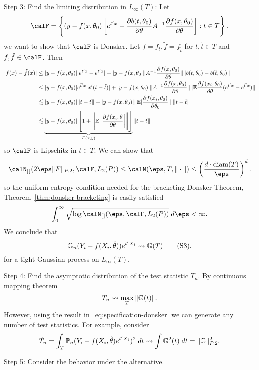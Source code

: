 \begin{example*}
	\underline{Step 3:} Find the limiting distribution in \(L_\infty(T)\): 
	Let 
	\[
		\calF = \left\{(y-f(x,\theta_0)\left[e^{t'x}-\frac{\partial b(t,\theta_0)}{\partial \theta}A^{-1}\frac{\partial f(x,\theta_0)}{\partial \theta}\right]: t\in T\right\}
	.\] 
	we want to show that \(\calF\) is Donsker. Let \(f = f_t, \tilde f = f_{\tilde t}\) for \(t,\tilde t \in T\) and \(f,\tilde f \in\calF\). Then
	\begin{align*}
		|f(x) - \tilde f(x)| 
		&\leq |y-f(x,\theta_0)||e^{t'x}-e^{\tilde t'x}| + |y-f(x,\theta_0|\|A^{-1}\frac{\partial f(x,\theta_0)}{\partial \theta}\|	\|b(t,\theta_0)-b(\tilde t,\theta_0)\| \\
		&\leq |y-f(x,\theta_0)|e^{\bar t' x}|x'(t-\tilde t)| + |y-f(x,\theta_0)| \|A^{-1}\frac{\partial f(x,\theta_0)}{\partial \theta}\|\|\mathbb{E}\frac{\partial f(x_i,\theta_0)}{\partial \theta}(e^{t'x}-e^{\tilde t'x})\|\\
		&\lesssim |y-f(x,\theta_0)|\|t-\tilde t\| + |y-f(x,\theta_0)|\|\mathbb{E}|\frac{\partial f(x_i,\theta_0)}{\partial \theta_0}|\|\|t-\tilde t\| \\
		&\lesssim \underbrace{|y-f(x,\theta_0)|\left[1+ \left\|\mathbb{E}\left|\frac{\partial f(x_i,\theta}{\partial \theta}\right|\right\|\right]}_{F(x,y)}\|t-\tilde t\|
	\end{align*}
	so \(\calF\) is Lipschitz in \(t\in T\). We can show that 
	\[
		\calN_{[\hspace{0.1em}]}(2\eps\|F\|_{P,2},\calF,L_2(P)) \leq \calN(\eps,T,\|\cdot\|) \leq  \left(\frac{d\cdot \text{diam}(T)}{\eps}\right)^d
	.\]
	so the uniform entropy condition needed for the bracketing Donsker Theorem, Theorem~\ref{thm:donsker-bracketing} is easily satisfied 
	\[
		\int_{0}^{\infty} \sqrt{\log\calN_{[\hspace{0.1em}]}(\eps,\calF,L_2(P))}\;d\eps < \infty 
	.\] 
	We conclude that 
	\[
		\mathbb{G}_n (Y_i - f(X_i,\hat\theta))e^{t'X_i}\rightsquigarrow \mathbb{G}(T)\tag{S3}\label{eq:specification-donsker}
	.\] 
	for a tight Gaussian process on \(L_\infty(T)\).

	\underline{Step 4:} Find the asymptotic distribution of the test statistic \(T_n\). By continuous mapping theorem 
	\[
		T_n \rightsquigarrow \max_T \|\mathbb{G}(t)\|
	.\]
	However, using the result in~\eqref{eq:specification-donsker} we can generate any number of test statistics. For example, consider
	\[
		\tilde T_n = \int_T \mathbb{P}_n(Y_i-f(X_i,\hat\theta)e^{t'X_i})^2\;dt \rightsquigarrow \int \mathbb{G}^2(t)\;dt = \|\mathbb{G}\|_{P,2}^2 
	.\]

	\underline{Step 5:} Consider the behavior under the alternative.


\end{example*}
